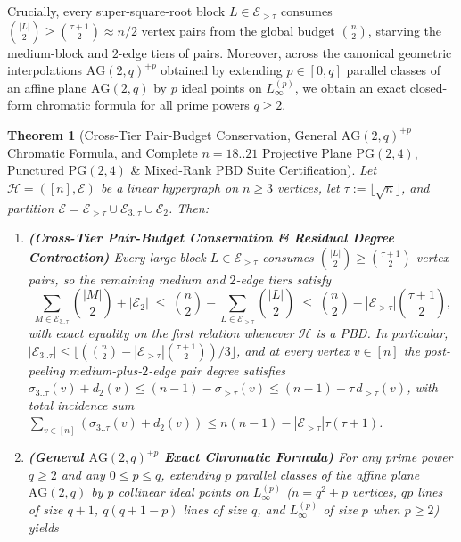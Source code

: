 \documentclass[11pt,reqno]{amsart}
\newtheorem{theorem}{Theorem}[section]
\theoremstyle{definition}
\theoremstyle{remark}
\begin{document}
Crucially, every super-square-root block $L \in \mathcal{E}_{>\tau}$ consumes $\binom{|L|}{2} \ge \binom{\tau+1}{2} \approx n/2$ vertex pairs from the global budget $\binom{n}{2}$, starving the medium-block and $2$-edge tiers of pairs. Moreover, across the canonical geometric interpolations $\mathrm{AG}(2,q)^{+p}$ obtained by extending $p \in [0, q]$ parallel classes of an affine plane $\mathrm{AG}(2,q)$ by $p$ ideal points on $L_\infty^{(p)}$, we obtain an exact closed-form chromatic formula for all prime powers $q \ge 2$.

\begin{theorem}[Cross-Tier Pair-Budget Conservation, General $\mathrm{AG}(2,q)^{+p}$ Chromatic Formula, and Complete $n = 18..21$ Projective Plane $\mathrm{PG}(2,4)$, Punctured $\mathrm{PG}(2,4)$ \& Mixed-Rank PBD Suite Certification]\label{thm:cross_tier_pair_budget}\label{thm:ag2q_ideal_point}
Let $\mathcal{H} = ([n], \mathcal{E})$ be a linear hypergraph on $n \ge 3$ vertices, let $\tau := \lfloor\sqrt{n}\rfloor$, and partition $\mathcal{E} = \mathcal{E}_{>\tau} \cup \mathcal{E}_{3..\tau} \cup \mathcal{E}_2$. Then:
\begin{enumerate}
  \item[\textup{(a)}] \textbf{(Cross-Tier Pair-Budget Conservation \& Residual Degree Contraction)} Every large block $L \in \mathcal{E}_{>\tau}$ consumes $\binom{|L|}{2} \ge \binom{\tau+1}{2}$ vertex pairs, so the remaining medium and $2$-edge tiers satisfy
  \begin{equation}\label{eq:cross_tier_pair_budget}
    \sum_{M \in \mathcal{E}_{3..\tau}} \binom{|M|}{2} + |\mathcal{E}_2| \;\le\; \binom{n}{2} - \sum_{L \in \mathcal{E}_{>\tau}} \binom{|L|}{2} \;\le\; \binom{n}{2} - |\mathcal{E}_{>\tau}|\binom{\tau+1}{2},
  \end{equation}
  with exact equality on the first relation whenever $\mathcal{H}$ is a PBD. In particular, $|\mathcal{E}_{3..\tau}| \le \lfloor (\binom{n}{2} - |\mathcal{E}_{>\tau}|\binom{\tau+1}{2})/3 \rfloor$, and at every vertex $v \in [n]$ the post-peeling medium-plus-$2$-edge pair degree satisfies $\sigma_{3..\tau}(v) + d_2(v) \le (n - 1) - \sigma_{>\tau}(v) \le (n - 1) - \tau\,d_{>\tau}(v)$, with total incidence sum $\sum_{v \in [n]}(\sigma_{3..\tau}(v) + d_2(v)) \le n(n - 1) - |\mathcal{E}_{>\tau}|\tau(\tau + 1)$.
  \item[\textup{(b)}] \textbf{(General $\mathrm{AG}(2,q)^{+p}$ Exact Chromatic Formula)} For any prime power $q \ge 2$ and any $0 \le p \le q$, extending $p$ parallel classes of the affine plane $\mathrm{AG}(2,q)$ by $p$ collinear ideal points on $L_\infty^{(p)}$ ($n = q^2 + p$ vertices, $qp$ lines of size $q + 1$, $q(q + 1 - p)$ lines of size $q$, and $L_\infty^{(p)}$ of size $p$ when $p \ge 2$) yields

\end{enumerate}
\end{theorem}
\end{document}
